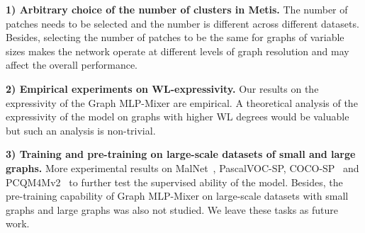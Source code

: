 \documentclass{article}
\begin{document}
\textbf{1) Arbitrary choice of the number of clusters in Metis.} The number of patches needs to be selected and the number is different across different datasets. Besides, selecting the number of patches to be the same for graphs of variable sizes makes the network operate at different levels of graph resolution and may affect the overall performance.

\textbf{2) Empirical experiments on WL-expressivity.} Our results on the expressivity of the Graph MLP-Mixer are empirical. A theoretical analysis of the expressivity of the model on graphs with higher WL degrees would be valuable but such an analysis is non-trivial.

\textbf{3) Training and pre-training on large-scale datasets of small and large graphs.} More experimental results on MalNet~\citep{freitas2020large_malnet}, PascalVOC-SP, COCO-SP~\citep{dwivedi2022long} and PCQM4Mv2~\citep{hu2020open} to further test the supervised ability of the model. Besides, the pre-training capability of Graph MLP-Mixer on large-scale datasets with small graphs and large graphs was also not studied. We leave these tasks as future work.
\end{document}
